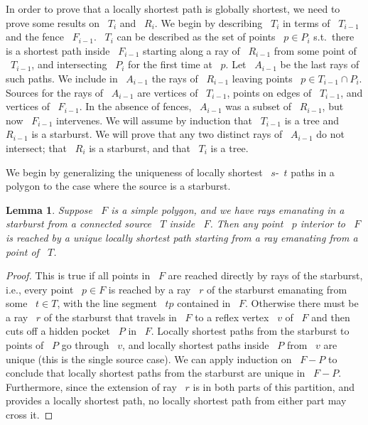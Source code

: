 \documentclass[11pt]{article}
\newtheorem{lemma}{Lemma}
\begin{document}
In order to prove that a locally shortest path is globally shortest, we need to prove some results on ~\(T_i\) and ~\(R_i\).
We begin by describing ~\(T_i\) in terms of ~\(T_{i-1}\) and the fence ~\(F_{i-1}\).
~\(T_i\) can be described as the set of points ~\(p \in P_i\) s.t.\ there is a shortest path inside ~\(F_{i-1}\) starting along a ray of ~\(R_{i-1}\) from some point of ~\(T_{i-1}\), and intersecting ~\(P_i\) for the first time at ~\(p\).
Let ~\(A_{i-1}\) be the last rays of such paths.
We include in ~\(A_{i-1}\) the rays of ~\(R_{i-1}\) leaving points ~\(p \in T_{i-1} \cap P_i\).
Sources for the rays of ~\(A_{i-1}\) are vertices of ~\(T_{i-1}\), points on edges of ~\(T_{i-1}\), and vertices of ~\(F_{i-1}\).
In the absence of fences, ~\(A_{i-1}\) was a subset of ~\(R_{i-1}\), but now ~\(F_{i-1}\) intervenes.
We will assume by induction that ~\(T_{i-1}\) is a tree and ~\(R_{i-1}\) is a starburst.
We will prove that any two distinct rays of ~\(A_{i-1}\) do not intersect; that ~\(R_i\) is a starburst, and that ~\(T_i\) is a tree.

We begin by generalizing the uniqueness of locally shortest ~\(s\)-~\(t\) paths in a polygon to the case where the source is a starburst.

\begin{lemma}
\label{lem:starburst-unique}
Suppose ~\(F\) is a simple polygon, and we have rays emanating in a starburst from a connected source ~\(T\) inside ~\(F\). Then any point ~\(p\) interior to ~\(F\) is reached by a unique locally shortest path starting from a ray emanating from a point of ~\(T\).
\end{lemma}

\begin{proof}
This is true if all points in ~\(F\) are reached directly by rays of the starburst, i.e., every point ~\(p \in F\) is reached by a ray ~\(r\) of the starburst emanating from some ~\(t \in T\), with the line segment ~\(tp\) contained in ~\(F\).
Otherwise there must be a ray ~\(r\) of the starburst that travels in ~\(F\) to a reflex vertex ~\(v\) of ~\(F\) and then cuts off a hidden pocket ~\(P\) in ~\(F\).
Locally shortest paths from the starburst to points of ~\(P\) go through ~\(v\), and locally shortest paths inside ~\(P\) from ~\(v\) are unique (this is the single source case).
We can apply induction on ~\(F - P\) to conclude that locally shortest paths from the starburst are unique in ~\(F - P\).
Furthermore, since the extension of ray ~\(r\) is in both parts of this partition, and provides a locally shortest path, no locally shortest path from either part may cross it.
\end{proof}
\end{document}
